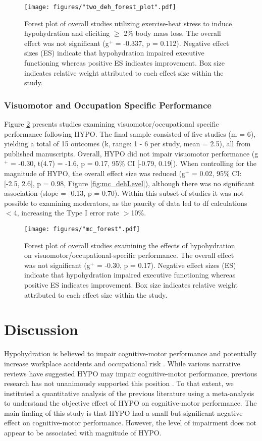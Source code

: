 \begin{figure}
	\centering
	\texttt{[image: figures/"two\_deh\_forest\_plot".pdf]}
	\caption{Forest plot of overall studies utilizing exercise-heat stress to induce hypohydration and eliciting ${\ge}$ 2\% body mass loss. The overall effect was not significant (g${^+}$ = -0.337, p = 0.112). Negative effect sizes (ES) indicate that hypohydration impaired executive functioning whereas positive ES indicates improvement. Box size indicates relative weight attributed to each effect size within the study.}
	\label{fig:two_deh_forest_plot}
\end{figure}


\subsubsection{Visuomotor and Occupation Specific Performance}
Figure \ref{fig:mc_forest} presents studies examining visuomotor/occupational specific performance following HYPO. The final sample consisted of five studies (m = 6), yielding a total of 15 outcomes (k, range: 1 - 6 per study, mean = 2.5), all from published manuscripts. Overall, HYPO did not impair visuomotor performance (g${^+}$ = -0.30, t(4.7) = -1.6, p = 0.17, 95\% CI [-0.79, 0.19]). When controlling for the magnitude of HYPO, the overall effect size was reduced (g${^+}$ = 0.02, 95\% CI: [-2.5, 2.6], p = 0.98, Figure \ref{fig:mc_dehLevel}), although there was no significant association (slope = -0.13, p = 0.70). Within this subset of studies it was not possible to examining moderators, as the paucity of data led to df calculations $<$4, increasing the Type I error rate $>$10\%.     

\begin{figure}
	\centering
	\texttt{[image: figures/"mc\_forest".pdf]}
	\caption{Forest plot of overall studies examining the effects of hypohydration on visuomotor/occupational-specific performance. The overall effect was not significant (g${^+}$ = -0.30, p = 0.17). Negative effect sizes (ES) indicate that hypohydration impaired executive functioning whereas positive ES indicates improvement. Box size indicates relative weight attributed to each effect size within the study.}
	\label{fig:mc_forest}
\end{figure}

\section{Discussion}
Hypohydration is believed to impair cognitive-motor performance and potentially increase workplace accidents and occupational risk \cite{kenefick_hydration_2007}. While various narrative reviews have suggested HYPO may impair cognitive-motor performance, previous research has not unanimously supported this position \cite{cheuvront_dehydration:_2014}. To that extent, we instituted a quantitative analysis of the previous literature using a meta-analysis to understand the objective effect of HYPO on cognitive-motor performance. The main finding of this study is that HYPO had a small but significant negative effect on cognitive-motor performance. However, the level of impairment does not appear to be associated with magnitude of HYPO.

